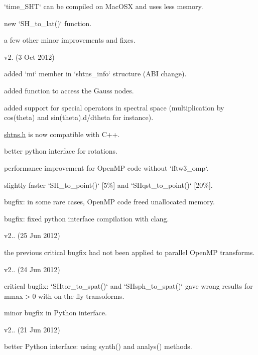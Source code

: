 \begin{DoxyItemize}
\begin{DoxyItemize}
\item `time\+\_\+\+S\+H\+T` can be compiled on Mac\+O\+S\+X and uses less memory.
\item new `\+S\+H\+\_\+to\+\_\+lat()` function.
\item a few other minor improvements and fixes.
\end{DoxyItemize}
\item v2. (3 Oct 2012)
\begin{DoxyItemize}
\item added `mi` member in `shtns\+\_\+info` structure (A\+B\+I change).
\item added function to access the Gauss nodes.
\item added support for special operators in spectral space (multiplication by cos(theta) and sin(theta).d/dtheta for instance).
\item \hyperlink{shtns_8h}{shtns.\+h} is now compatible with C++.
\item better python interface for rotations.
\item performance improvement for Open\+M\+P code without `fftw3\+\_\+omp`.
\item slightly faster `\+S\+H\+\_\+to\+\_\+point()` \mbox{[}5\%\mbox{]} and `\+S\+Hqst\+\_\+to\+\_\+point()` \mbox{[}20\%\mbox{]}.
\item bugfix\+: in some rare cases, Open\+M\+P code freed unallocated memory.
\item bugfix\+: fixed python interface compilation with clang.
\end{DoxyItemize}
\item v2.. (25 Jun 2012)
\begin{DoxyItemize}
\item the previous critical bugfix had not been applied to parallel Open\+M\+P transforms.
\end{DoxyItemize}
\item v2.. (24 Jun 2012)
\begin{DoxyItemize}
\item critical bugfix\+: `\+S\+Htor\+\_\+to\+\_\+spat()` and `\+S\+Hsph\+\_\+to\+\_\+spat()` gave wrong results for mmax$>$0 with on-\/the-\/fly transoforms.
\item minor bugfix in Python interface.
\end{DoxyItemize}
\item v2.. (21 Jun 2012)
\begin{DoxyItemize}
\item better Python interface\+: using {\ttfamily synth()} and {\ttfamily analys()} methods.

\end{DoxyItemize}
\end{DoxyItemize}

